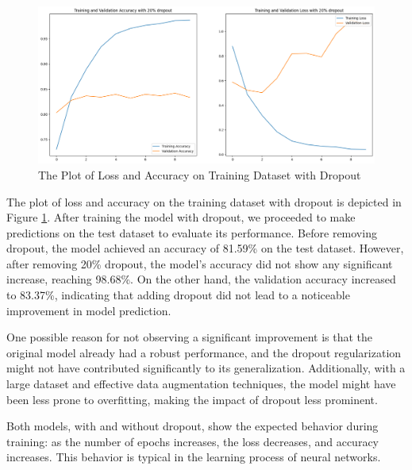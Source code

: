 \documentclass[11pt,a4paper]{article}
\begin{document}
 \begin{figure}[h!]
 \centering
  \includegraphics[width=\linewidth]{dropout_training_plot.png}
  \caption{The Plot of Loss and Accuracy on Training Dataset with Dropout}
  \label{dropout_training}
\end{figure}
\FloatBarrier

The plot of loss and accuracy on the training dataset with dropout is depicted in Figure \ref{dropout_training}. After training the model with dropout, we proceeded to make predictions on the test dataset to evaluate its performance. Before removing dropout, the model achieved an accuracy of 81.59\% on the test dataset. However, after removing 20\% dropout, the model's accuracy did not show any significant increase, reaching 98.68\%. On the other hand, the validation accuracy increased to 83.37\%, indicating that adding dropout did not lead to a noticeable improvement in model prediction.

One possible reason for not observing a significant improvement is that the original model already had a robust performance, and the dropout regularization might not have contributed significantly to its generalization. Additionally, with a large dataset and effective data augmentation techniques, the model might have been less prone to overfitting, making the impact of dropout less prominent.

Both models, with and without dropout, show the expected behavior during training: as the number of epochs increases, the loss decreases, and accuracy increases. This behavior is typical in the learning process of neural networks.
\end{document}
